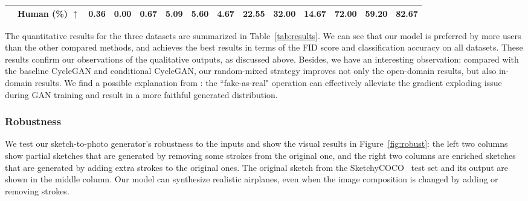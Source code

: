 \documentclass[10pt,twocolumn,letterpaper]{article}
\begin{document}
\begin{table*}[t]
{\begin{tabular}{c|c|ccc|ccc|ccc|ccc}
            & Human (\%) $\uparrow$&  0.36    & 0.00   &   0.67    &  5.09   & 5.60   &   4.67  &  22.55   & 32.00   &   14.67    &   \textbf{72.00}                        &       \textbf{59.20}                    &         \textbf{82.67}                   \\ 
\hline
\end{tabular}
}
\caption{Quantitative evaluation and user study on Scribble and SketchyCOCO datasets. We show the full testset results, in-domain results, and open-domain results, respectively. Best results are shown in \textbf{bold}.}


\label{tab:results}
\end{table*}

The quantitative results for the three datasets are summarized in Table~\ref{tab:results}. We can see that our model is preferred by more users than the other compared methods, and achieves the best results in terms of the FID score and classification accuracy on all datasets. These results confirm our observations of the qualitative outputs, as discussed above. Besides, we have an interesting observation: compared with the baseline CycleGAN and conditional CycleGAN, our random-mixed strategy improves not only the open-domain results, but also in-domain results. We find a possible explanation from \cite{tao2020alleviation}: the ``fake-as-real" operation can effectively alleviate the gradient exploding issue during GAN training and result in a more faithful generated distribution.



\subsubsection{Robustness}
\label{sec:exp_robust}
We test our sketch-to-photo generator's robustness to the inputs and show the visual results in Figure~\ref{fig:robust}: the left two columns show partial sketches that are generated by removing some strokes from the original one, and the right two columns are enriched sketches that are generated by adding extra strokes to the original ones. The original sketch from the SketchyCOCO~\cite{gao2020sketchycoco} test set and its output are shown in the middle column. Our model can synthesize realistic airplanes, even when the image composition is changed by adding or removing strokes. 
\end{document}
